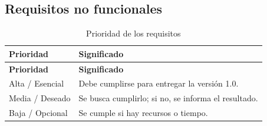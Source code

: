 \documentclass[11pt]{article}
\begin{document}
\subsection{Requisitos no funcionales}
{\small
\begin{longtable}{|>{\RaggedRight\arraybackslash}p{3.91cm}|>{\RaggedRight\arraybackslash}p{10.95cm}|}
\caption{Prioridad de los requisitos}\\
\hline
\rowcolor{encabezado}\textbf{Prioridad} & \textbf{Significado} \\ \hline
\endfirsthead
\hline
\rowcolor{encabezado}\textbf{Prioridad} & \textbf{Significado} \\ \hline
\endhead
Alta / Esencial & Debe cumplirse para entregar la versión 1.0. \\ \hline
Media / Deseado & Se busca cumplirlo; si no, se informa el resultado. \\ \hline
Baja / Opcional & Se cumple si hay recursos o tiempo. \\ \hline
\end{longtable}}
\end{document}
